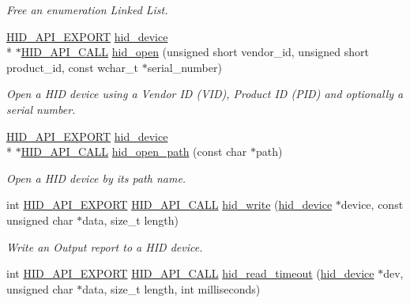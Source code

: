 \begin{DoxyCompactItemize}
\begin{DoxyCompactList}\small\item\em Free an enumeration Linked List. \end{DoxyCompactList}\item 
\hyperlink{osx_2hidapi_8h_aa60150016800ccb88fdf140e8553ae13}{H\-I\-D\-\_\-\-A\-P\-I\-\_\-\-E\-X\-P\-O\-R\-T} \hyperlink{linux_2hidapi_8h_aa6da74d5686d198dd3e5440e60088fcc}{hid\-\_\-device} \\*
$\ast$\hyperlink{osx_2hidapi_8h_af140a25716604e86096670a505a58ee0}{H\-I\-D\-\_\-\-A\-P\-I\-\_\-\-C\-A\-L\-L} \hyperlink{group__API_gae6910ed9f01c4a99d25539b16800e90c}{hid\-\_\-open} (unsigned short vendor\-\_\-id, unsigned short product\-\_\-id, const wchar\-\_\-t $\ast$serial\-\_\-number)
\begin{DoxyCompactList}\small\item\em Open a H\-I\-D device using a Vendor I\-D (V\-I\-D), Product I\-D (P\-I\-D) and optionally a serial number. \end{DoxyCompactList}\item 
\hyperlink{osx_2hidapi_8h_aa60150016800ccb88fdf140e8553ae13}{H\-I\-D\-\_\-\-A\-P\-I\-\_\-\-E\-X\-P\-O\-R\-T} \hyperlink{linux_2hidapi_8h_aa6da74d5686d198dd3e5440e60088fcc}{hid\-\_\-device} \\*
$\ast$\hyperlink{osx_2hidapi_8h_af140a25716604e86096670a505a58ee0}{H\-I\-D\-\_\-\-A\-P\-I\-\_\-\-C\-A\-L\-L} \hyperlink{group__API_ga1e87518670f88540c920dc451df608ee}{hid\-\_\-open\-\_\-path} (const char $\ast$path)
\begin{DoxyCompactList}\small\item\em Open a H\-I\-D device by its path name. \end{DoxyCompactList}\item 
int \hyperlink{osx_2hidapi_8h_aa60150016800ccb88fdf140e8553ae13}{H\-I\-D\-\_\-\-A\-P\-I\-\_\-\-E\-X\-P\-O\-R\-T} \hyperlink{osx_2hidapi_8h_af140a25716604e86096670a505a58ee0}{H\-I\-D\-\_\-\-A\-P\-I\-\_\-\-C\-A\-L\-L} \hyperlink{group__API_gad14ea48e440cf5066df87cc6488493af}{hid\-\_\-write} (\hyperlink{linux_2hidapi_8h_aa6da74d5686d198dd3e5440e60088fcc}{hid\-\_\-device} $\ast$device, const unsigned char $\ast$data, size\-\_\-t length)
\begin{DoxyCompactList}\small\item\em Write an Output report to a H\-I\-D device. \end{DoxyCompactList}\item 
int \hyperlink{osx_2hidapi_8h_aa60150016800ccb88fdf140e8553ae13}{H\-I\-D\-\_\-\-A\-P\-I\-\_\-\-E\-X\-P\-O\-R\-T} \hyperlink{osx_2hidapi_8h_af140a25716604e86096670a505a58ee0}{H\-I\-D\-\_\-\-A\-P\-I\-\_\-\-C\-A\-L\-L} \hyperlink{group__API_gaa5c9ed5aa290688ffac03343989ad75a}{hid\-\_\-read\-\_\-timeout} (\hyperlink{linux_2hidapi_8h_aa6da74d5686d198dd3e5440e60088fcc}{hid\-\_\-device} $\ast$dev, unsigned char $\ast$data, size\-\_\-t length, int milliseconds)

\end{DoxyCompactItemize}
